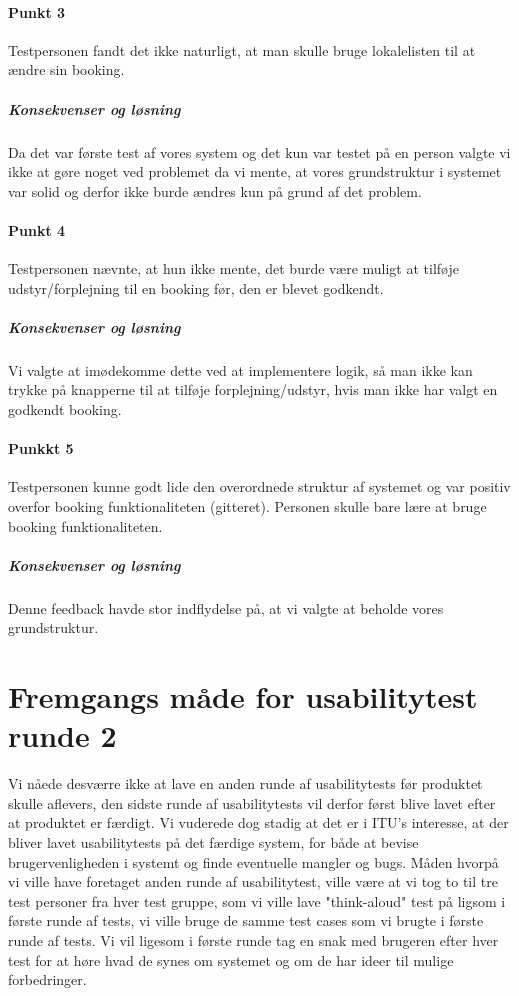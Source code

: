 \paragraph{Punkt 3}
Testpersonen fandt det ikke naturligt, at man skulle bruge lokalelisten til at ændre sin booking.
\subparagraph{Konsekvenser og løsning}
Da det var første test af vores system og det kun var testet på en person valgte vi ikke at gøre noget ved problemet da vi mente, at vores grundstruktur i systemet var solid og derfor ikke burde ændres kun på grund af det problem.

\paragraph{Punkt 4}
Testpersonen nævnte, at hun ikke mente, det burde være muligt at tilføje udstyr/forplejning til en booking før, den er blevet godkendt.
\subparagraph{Konsekvenser og løsning}
Vi valgte at imødekomme dette ved at implementere logik, så man ikke kan trykke på knapperne til at tilføje forplejning/udstyr, hvis man ikke har valgt en godkendt booking.

\paragraph{Punkkt 5}
Testpersonen kunne godt lide den overordnede struktur af systemet og var positiv overfor booking funktionaliteten (gitteret). Personen skulle bare lære at bruge booking funktionaliteten.
\subparagraph{Konsekvenser og løsning}
Denne feedback havde stor indflydelse på, at vi valgte at beholde vores grundstruktur.

\section{Fremgangs måde for usabilitytest runde 2}
\label{Usability_R2}
Vi nåede desværre ikke at lave en anden runde af usabilitytests før produktet skulle aflevers, den sidste runde af usabilitytests vil derfor først blive lavet efter at produktet er færdigt. Vi vuderede dog stadig at det er i ITU's interesse, at der bliver lavet usabilitytests på det færdige system, for både at bevise brugervenligheden i systemt og finde eventuelle mangler og bugs. Måden hvorpå vi ville have foretaget anden runde af usabilitytest, ville være at vi tog to til tre test personer fra hver test gruppe, som vi ville lave "think-aloud" test på ligsom i første runde af tests, vi ville bruge de samme test cases som vi brugte i første runde af tests. Vi vil ligesom i første runde tag en snak med brugeren efter hver test for at høre hvad de synes om systemet og om de har ideer til mulige forbedringer.  

